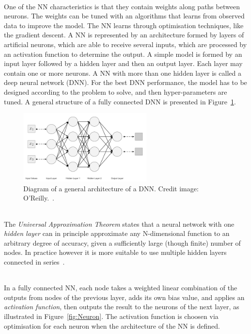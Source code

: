 \ \\One of the NN characteristics is that they contain weights along paths between neurons. The weights can be tuned with an algorithms that learns from observed data to improve the model. The NN learns through optimisation techniques, like the gradient descent. A NN is represented by an architecture formed by layers of artificial neurons, which are able to receive several inputs, which are processed by an activation function to determine the output. A simple model is formed by an input layer followed by a hidden layer and then an output layer. Each layer may contain one or more neurons. A NN with more than one hidden layer is called a deep neural network (DNN). For the best DNN performance, the model has to be designed according to the problem to solve, and then hyper-parameters are tuned. A general structure of a fully connected DNN is presented in Figure~\ref{fig:DNN}.

\begin{figure}[h]
  \centering
  \includegraphics[width=0.6\textwidth]{./plots/DNNArchitecture.png}
  \caption{Diagram of a general architecture of a DNN. Credit image: O'Reilly.~\cite{OReilly}.}
  \label{fig:DNN}
\end{figure}

\ \\The \emph{Universal Approximation Theorem} states that a neural network with one \emph{hidden layer} can in principle approximate any N-dimensional function to an arbitrary degree of accuracy, given a sufficiently large (though finite) number of nodes. In practice however it is more suitable to use multiple hidden layers connected in series~\cite{AndrewNg}.

\ \\In a fully connected NN, each node takes a weighted linear combination of the outputs from nodes of the previous layer, adds its own bias value, and applies an \emph{activation function}, then outputs the result to the neurons of the next layer, as illustrated in Figure~\ref{fig:Neuron}. The activation function is choosen via optimisation for each neuron when the architecture of the NN is defined. 

